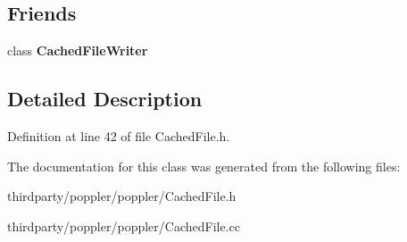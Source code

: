 \subsection*{Friends}
\begin{DoxyCompactItemize}
\item 
\mbox{\label{class_cached_file_a4811a6788dd753bbb7caded2df9dd117}} 
class {\bfseries Cached\+File\+Writer}
\end{DoxyCompactItemize}


\subsection{Detailed Description}


Definition at line 42 of file Cached\+File.\+h.



The documentation for this class was generated from the following files\+:\begin{DoxyCompactItemize}
\item 
thirdparty/poppler/poppler/Cached\+File.\+h\item 
thirdparty/poppler/poppler/Cached\+File.\+cc\end{DoxyCompactItemize}
